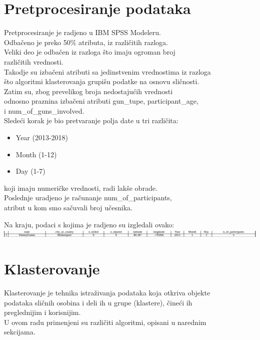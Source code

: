 \documentclass[
	12pt,			
	openright,		
	oneside,			
	a4paper,		
	english,			
	]{article}
\begin{document}
\newpage
\section{Pretprocesiranje podataka}



Pretprocesiranje je radjeno u IBM SPSS Modeleru. \\
Odbačeno je preko 50\% atributa, iz različitih razloga. \\
Veliki deo je odbačen iz razloga što imaju ogroman broj \\
različitih vrednosti. \\
Takodje su izbačeni atributi sa
jedinstvenim vrednostima iz razloga\\
što algoritmi klasterovanja
grupišu podatke na osnovu sličnosti. \\

Zatim su, zbog prevelikog broja nedostajućih vrednosti \\
odnosno praznina izbačeni atributi gun\_tupe, participant\_age, \\
i num\_of\_guns\_involved.\\

Sledeći korak je bio pretvaranje polja date u tri različita: \\
\begin{itemize}
    \item Year (2013-2018)
    \item Month (1-12)
    \item Day (1-7)
\end{itemize}{}
koji imaju numeričke vrednosti, radi lakše obrade. \\

Poslednje uradjeno je računanje num\_of\_participants, \\
atribut u kom smo sačuvali broj učesnika.

Na kraju, podaci s kojima je radjeno su izgledali ovako: \\




    \includegraphics[width = 15cm]{Slike/final.png}

\newpage
\section{Klasterovanje}
Klasterovanje je tehnika istraživanja podataka koja otkriva objekte \\ podataka sličnih osobina i deli ih u grupe (klastere), čineći ih \\ preglednijim i korisnijim. \\
U ovom radu primenjeni su različiti algoritmi, opisani u narednim \\
sekcijama.
\end{document}
